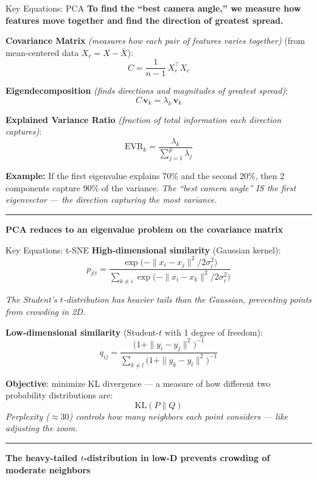 \documentclass[8pt,aspectratio=169]{beamer}
\newcommand{\bottomnote}[1]{%
\vfill
\vspace{-2mm}
\textcolor{mllavender2}{\rule{\textwidth}{0.4pt}}
\vspace{1mm}
\footnotesize
\textbf{#1}
}
\begin{document}
\begin{frame}[t]{Key Equations: PCA}
\textbf{To find the ``best camera angle,'' we measure how features move together and find the direction of greatest spread.}
\vspace{0.3em}

\textbf{Covariance Matrix} \textit{(measures how each pair of features varies together)} (from mean-centered data $X_c = X - \bar{X}$):
\[
C = \frac{1}{n-1}\, X_c^\top X_c
\]

\textbf{Eigendecomposition} \textit{(finds directions and magnitudes of greatest spread)}:
\[
C\, \mathbf{v}_k = \lambda_k\, \mathbf{v}_k
\]

\textbf{Explained Variance Ratio} \textit{(fraction of total information each direction captures)}:
\[
\text{EVR}_k = \frac{\lambda_k}{\displaystyle\sum_{j=1}^{p} \lambda_j}
\]

\textbf{Example:} If the first eigenvalue explains 70\% and the second 20\%, then 2 components capture 90\% of the variance.
\vspace{0.2em}
\textit{The ``best camera angle'' IS the first eigenvector --- the direction capturing the most variance.}
\bottomnote{PCA reduces to an eigenvalue problem on the covariance matrix}
\end{frame}

\begin{frame}[t]{Key Equations: t-SNE}
\textbf{High-dimensional similarity} (Gaussian kernel):
\[
p_{j|i} = \frac{\exp\!\bigl(-\|x_i - x_j\|^2 / 2\sigma_i^2\bigr)}{\sum_{k \neq i}\exp\!\bigl(-\|x_i - x_k\|^2 / 2\sigma_i^2\bigr)}
\]

\vspace{0.1em}
\textit{The Student's $t$-distribution has heavier tails than the Gaussian, preventing points from crowding in 2D.}
\vspace{0.1em}

\textbf{Low-dimensional similarity} (Student-$t$ with 1 degree of freedom):
\[
q_{ij} = \frac{\bigl(1 + \|y_i - y_j\|^2\bigr)^{-1}}{\sum_{k \neq l}\bigl(1 + \|y_k - y_l\|^2\bigr)^{-1}}
\]

\vspace{0.2em}
\textbf{Objective}: minimize KL divergence --- a measure of how different two probability distributions are:
\[
\text{KL}(P \| Q)
\]
\vspace{0.1em}
\textit{Perplexity ($\approx 30$) controls how many neighbors each point considers --- like adjusting the zoom.}
\bottomnote{The heavy-tailed $t$-distribution in low-D prevents crowding of moderate neighbors}
\end{frame}
\end{document}
